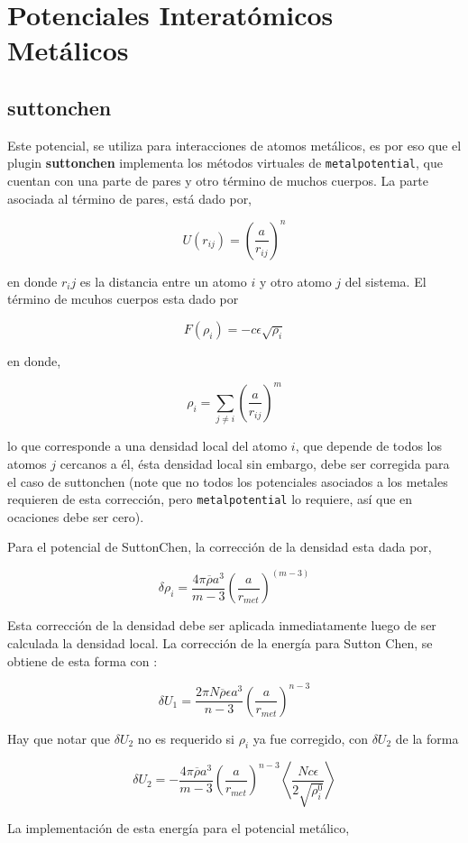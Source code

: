 \documentclass[a4paper,10pt]{scrbook}
\begin{document}
\section{Potenciales Interat\'omicos Met\'alicos}
\subsection{suttonchen}
Este potencial, se utiliza para interacciones de atomos met\'alicos, es por eso que el plugin \textbf{suttonchen} implementa los m\'etodos virtuales de \verb|metalpotential|, que cuentan con una parte de pares y otro t\'ermino de muchos cuerpos. La parte asociada al t\'ermino de pares, est\'a dado por,

$$U(r_{ij}) = \left(\frac{a}{r_{ij}}\right)^n$$

en donde $r_ij$ es la distancia entre un atomo $i$ y otro atomo $j$ del sistema. El t\'ermino de mcuhos cuerpos esta dado por

$$F(\rho_{i}) = -c\epsilon\sqrt{\rho_i}$$

en donde,

$$\rho_i = \sum_{j\neq i} \left(\frac{a}{r_{ij}}\right)^m$$

lo que corresponde a una densidad local del atomo $i$, que depende de todos los atomos $j$ cercanos a \'el, \'esta densidad local sin embargo, debe ser corregida para el caso de suttonchen (note que no todos los potenciales asociados a los metales requieren de esta correcci\'on, pero \verb|metalpotential| lo requiere, as\'i que en ocaciones debe ser cero).

Para el potencial de SuttonChen, la correcci\'on de la densidad esta dada por,

$$\delta\rho_i=\frac{4\pi\overline{\rho}a^3}{m-3}\left(\frac{a}{r_{met}}\right)^{(m-3)}$$

Esta correcci\'on de la densidad debe ser aplicada inmediatamente luego de ser calculada la densidad local. La correcci\'on de la energ\'ia para Sutton Chen, se obtiene de esta forma con :

$$\delta U_1 = \frac{2\pi N\overline{\rho}\epsilon a^3}{n-3}\left(\frac{a}{r_{met}}\right)^{n-3}$$

Hay que notar que $\delta U_2$ no es requerido si $\rho_i$ ya fue corregido, con $\delta U_2$ de la forma

$$\delta U_2 = -\frac{4\pi\overline{\rho}a^3}{m-3}\left(\frac{a}{r_{met}}\right)^{n-3}\left<\frac{Nc\epsilon}{2\sqrt{\rho_i^0}}\right>$$

La implementaci\'on de esta energ\'ia para el potencial met\'alico, 
\end{document}
